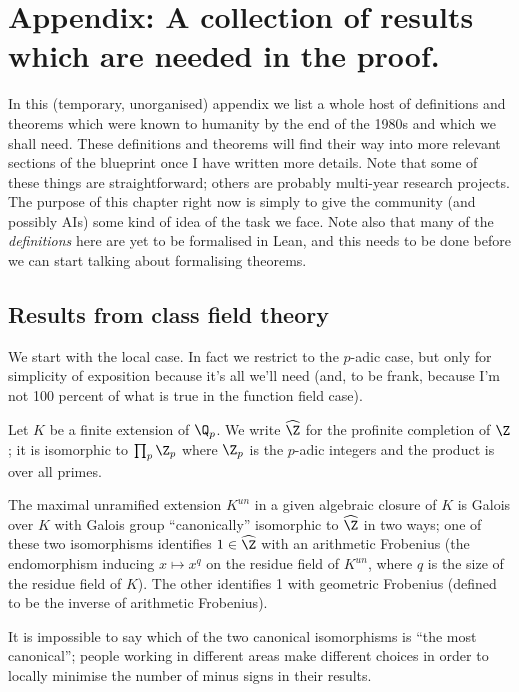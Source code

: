 \chapter{Appendix: A collection of results which are needed in the proof.}\label{ch_bestiary}

In this (temporary, unorganised) appendix we list a whole host of definitions and theorems which were known to humanity by the end of the 1980s and which we shall need. These definitions and theorems will find their way into more relevant sections of the blueprint once I have written more details. Note that some of these things are straightforward; others are probably multi-year research projects. The purpose of this chapter right now is simply to give the community (and possibly AIs) some kind of idea of the task we face. Note also that many of the \emph{definitions} here are yet to be formalised in Lean, and this needs to be done before we can start talking about formalising theorems.

\section{Results from class field theory}

We start with the local case. In fact we restrict to the $p$-adic case, but only for simplicity of exposition because it's all we'll need (and, to be frank, because I'm not 100 percent of what is true in the function field case).

Let $K$ be a finite extension of $\Q_p$. We write $\widehat{\Z}$ for the profinite completion of $\Z$; it is isomorphic to $\prod_p\Z_p$ where $\Z_p$ is the $p$-adic integers and the product is over all primes.

\begin{theorem}\label{maximal_unramified_extension_of_p-adic_field}\notready The maximal unramified extension $K^{un}$ in a given algebraic closure of $K$
    is Galois over $K$ with Galois group ``canonically'' isomorphic to $\widehat{\Z}$ in two ways; one of these two isomorphisms identifies $1\in\widehat{\Z}$ with an arithmetic Frobenius (the endomorphism inducing $x\mapsto x^q$ on the residue field of $K^{un}$, where $q$ is the size of the residue field of $K$). The other identifies 1 with geometric Frobenius (defined to be the inverse of arithmetic Frobenius).
\end{theorem}

It is impossible to say which of the two canonical isomorphisms is ``the most canonical''; people working in different areas make different choices in order to locally minimise the number of minus signs in their results.

